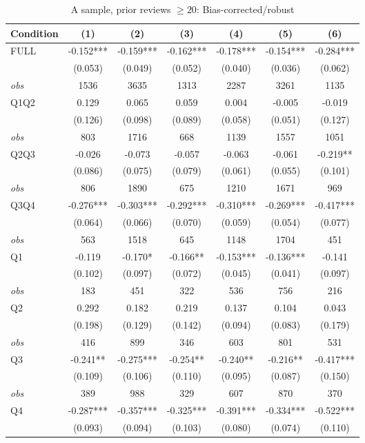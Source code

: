 \begin{table}[!htbp]
\centering
\caption{A sample, prior reviews $\geq20$: Bias-corrected/robust}
\begin{tabular}{lcccccc}
\toprule
Condition & (1) & (2) & (3) & (4) & (5) & (6) \\
\midrule
FULL & -0.152*** & -0.159*** & -0.162*** & -0.178*** & -0.154*** & -0.284*** \\
 & (0.053) & (0.049) & (0.052) & (0.040) & (0.036) & (0.062) \\
\textit{obs} & 1536 & 3635 & 1313 & 2287 & 3261 & 1135 \\
Q1Q2 & 0.129 & 0.065 & 0.059 & 0.004 & -0.005 & -0.019 \\
 & (0.126) & (0.098) & (0.089) & (0.058) & (0.051) & (0.127) \\
\textit{obs} & 803 & 1716 & 668 & 1139 & 1557 & 1051 \\
Q2Q3 & -0.026 & -0.073 & -0.057 & -0.063 & -0.061 & -0.219** \\
 & (0.086) & (0.075) & (0.079) & (0.061) & (0.055) & (0.101) \\
\textit{obs} & 806 & 1890 & 675 & 1210 & 1671 & 969 \\
Q3Q4 & -0.276*** & -0.303*** & -0.292*** & -0.310*** & -0.269*** & -0.417*** \\
 & (0.064) & (0.066) & (0.070) & (0.059) & (0.054) & (0.077) \\
\textit{obs} & 563 & 1518 & 645 & 1148 & 1704 & 451 \\
Q1 & -0.119 & -0.170* & -0.166** & -0.153*** & -0.136*** & -0.141 \\
 & (0.102) & (0.097) & (0.072) & (0.045) & (0.041) & (0.097) \\
\textit{obs} & 183 & 451 & 322 & 536 & 756 & 216 \\
Q2 & 0.292 & 0.182 & 0.219 & 0.137 & 0.104 & 0.043 \\
 & (0.198) & (0.129) & (0.142) & (0.094) & (0.083) & (0.179) \\
\textit{obs} & 416 & 899 & 346 & 603 & 801 & 531 \\
Q3 & -0.241** & -0.275*** & -0.254** & -0.240** & -0.216** & -0.417*** \\
 & (0.109) & (0.106) & (0.110) & (0.095) & (0.087) & (0.150) \\
\textit{obs} & 389 & 988 & 329 & 607 & 870 & 370 \\
Q4 & -0.287*** & -0.357*** & -0.325*** & -0.391*** & -0.334*** & -0.522*** \\
 & (0.093) & (0.094) & (0.103) & (0.080) & (0.074) & (0.110) \\

\end{tabular}
\end{table}

